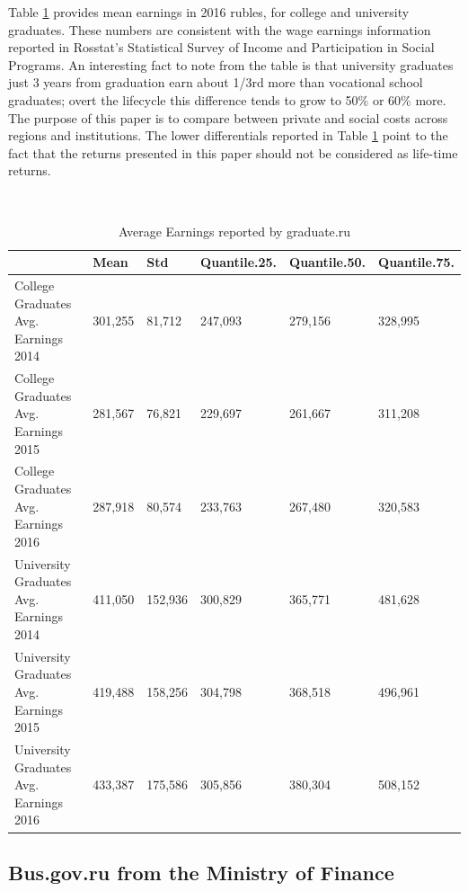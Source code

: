 \documentclass[alpha-refs]{wiley-article-05g}
\begin{document}
\vspace{-0.35in}

Table \ref{tab:1.1} provides mean earnings in 2016 rubles, for college and university graduates. These numbers are consistent with the wage earnings information reported in Rosstat's Statistical Survey of Income and Participation in Social Programs. An interesting fact to note from the table is that university graduates just 3 years from graduation earn about 1/3rd more than vocational school graduates; overt the lifecycle this difference tends to grow to 50\% or 60\% more. The purpose of this paper is to compare between private and social costs across regions and institutions. The lower differentials reported in Table \ref{tab:1.1} point to the fact that the returns presented in this paper should not be considered as life-time returns. 

\begin{table}[htbp!]
    \centering
		\caption{Average Earnings reported by graduate.ru}
		\label{tab:1.1}\\
    \begin{tabular}{|l|l|l|l|l|l|}
    \hline
         & Mean & Std & Quantile.25. & Quantile.50. & Quantile.75. \\ \hline
        College Graduates Avg. Earnings 2014 & 301,255 & 81,712 & 247,093 & 279,156 & 328,995 \\ \hline
        College Graduates Avg. Earnings 2015 & 281,567 & 76,821 & 229,697 & 261,667 & 311,208 \\ \hline
        College Graduates Avg. Earnings 2016 & 287,918 & 80,574 & 233,763 & 267,480 & 320,583 \\ \hline
        University Graduates Avg. Earnings 2014 & 411,050 & 152,936 & 300,829 & 365,771 & 481,628 \\ \hline
        University Graduates Avg. Earnings 2015 & 419,488 & 158,256 & 304,798 & 368,518 & 496,961 \\ \hline
        University Graduates Avg. Earnings 2016 & 433,387 & 175,586 & 305,856 & 380,304 & 508,152 \\ \hline
    \end{tabular}
\end{table}

\vspace{-0.3in}

\subsection{Bus.gov.ru from the Ministry of Finance}
\end{document}
